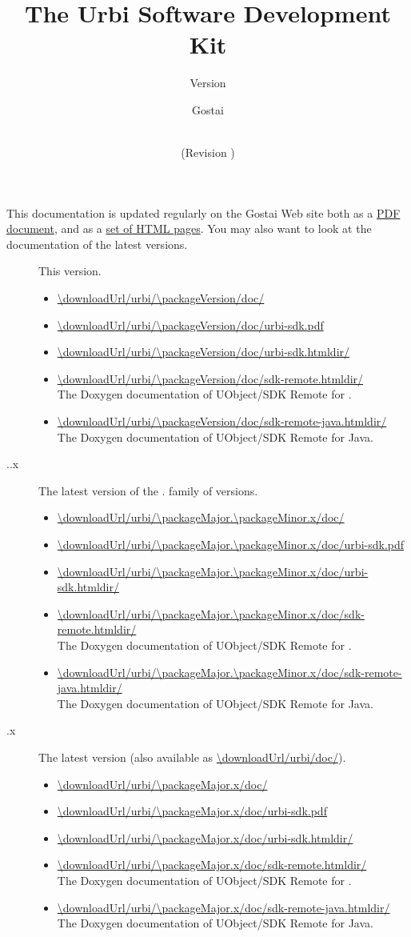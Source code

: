 \documentclass[openright,twoside,11pt,final]{book}
\title{The Urbi Software Development Kit}
\subtitle{Version \packageVersion}
\date{\VcsDay\\(Revision \VcsDescription)}
\author{Gostai}
\begin{document}
\maketitle

This documentation is updated regularly on the Gostai Web site both as a
\href{\docurl/urbi-sdk.pdf}{PDF document}, and as a
\href{\docurl/urbi-sdk.htmldir/}{set of HTML pages}.  You may also want to
look at the documentation of the latest versions.

\newcommand{\versionItem}[2]
{
\item[\packageName{} #1] #2.

  \begin{itemize}
  \item \url{\downloadUrl/urbi/#1/doc/}
  \item \url{\downloadUrl/urbi/#1/doc/urbi-sdk.pdf}
  \item \url{\downloadUrl/urbi/#1/doc/urbi-sdk.htmldir/}
  \item \url{\downloadUrl/urbi/#1/doc/sdk-remote.htmldir/} \\
    The Doxygen documentation of UObject/SDK Remote for \Cxx.
  \item \url{\downloadUrl/urbi/#1/doc/sdk-remote-java.htmldir/} \\
    The Doxygen documentation of UObject/SDK Remote for Java.
  \end{itemize}
}
\begin{description}
\versionItem{\packageVersion}{This version}
\versionItem{\packageMajor.\packageMinor.x}{The latest version of the
  \packageMajor.\packageMinor{} family of versions}
\versionItem{\packageMajor.x}{The latest version (also available as
  \url{\downloadUrl/urbi/doc/})}
\end{description}



\tableofcontents







{
  
}

\end{document}
